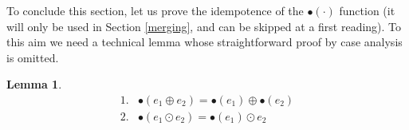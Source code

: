 \documentclass[preprint]{sigplanconf}
\newcounter{item}
\newtheorem{lemma}[item]{Lemma}
\begin{document}
To conclude this section, let us prove the idempotence
of the $\bullet{(\cdot)}$ function (it will only be used
in Section \ref{merging}, and can be skipped at a first reading). 
To this aim we need a technical lemma whose straightforward proof by
case analysis is omitted.



\begin{lemma}
~\vspace{-0.45cm}
$$
\begin{array}{ll}
1. & \bullet(e_1 \oplus e_2) = \bullet(e_1) \oplus \bullet(e_2)\\
2. & \bullet(e_1 \odot e_2) = \bullet(e_1) \odot e_2
\end{array}
$$
\end{lemma}
\end{document}
